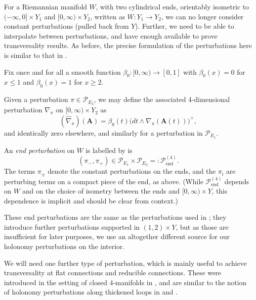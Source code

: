 \documentclass{memo-l}
\theoremstyle{definition}
\theoremstyle{remark}
\numberwithin{section}{chapter}
\numberwithin{equation}{chapter}
\begin{document}
For a Riemannian manifold $W$, with two cylindrical ends, orientably isometric to $(-\infty, 0] \times Y_1$ and $[0,\infty) \times Y_2$, written as $W: Y_1 \to Y_2$, we can no longer consider constant perturbations (pulled back from $Y$). Further, we need to be able to interpolate between perturbations, and have enough available to prove transversality results. As before, the precise formulation of the perturbations here is similar to that in \cite[Section~3.2]{KM1}. 

Fix once and for all a smooth function $\beta_0: [0, \infty) \to [0,1]$ with $\beta_0(x) = 0$ for $x \leq 1$ and $\beta_0(x) = 1$ for $x \geq 2$.

Given a perturbation $\pi \in \mathcal P_{E_2}$, we may define the associated 4-dimensional perturbation $\widehat{\nabla}_{\pi}$ on $[0,\infty) \times Y_2$ as $$(\widehat \nabla_{\pi})(\mathbf{A}) = \beta_0(t)\big(dt \wedge \nabla_{\pi}(\mathbf{A}(t))\big)^+,$$ and identically zero elsewhere, and similarly for a perturbation in $\mathcal P_{E_1}$. 

An \emph{end perturbation} on $W$ is labelled by is $$(\pi_-, \pi_+) \in \mathcal P_{E_1} \times \mathcal P_{E_2} =: \mathcal P^{(4)}_{\text{end}}.$$ The terms $\pi_\pm$ denote the constant perturbations on the ends, and the $\pi_i$ are perturbing terms on a compact piece of the end, as above. (While $\mathcal P^{(4)}_{\text{end}}$ depends on $W$ and on the choice of isometry between the ends and $[0,\infty) \times Y$, this dependence is implicit and should be clear from context.) 

These end perturbations are the same as the perturbations used in \cite{KM1}; they introduce further perturbations supported in $(1,2) \times Y$, but as those are insufficient for later purposes, we use an altogether different source for our holonomy perturbations on the interior. 

We will need one further type of perturbation, which is mainly useful to achieve transversality at flat connections and reducible connections. These were introduced in the setting of closed 4-manifolds in \cite{Kronheimer}, and are similar to the notion of holonomy perturbations along thickened loops in \cite{donaldson1987orientation} and \cite{Fr3}.
\end{document}
